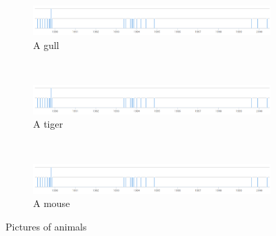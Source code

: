 \documentclass{article}
\begin{document}
\begin{figure}
    \centering
    \begin{subfigure}[b]{0.3\textwidth}
        \includegraphics[width=\textwidth]{../images/rg_timeline_pm230.png}
        \caption{A gull}
        \label{fig:gull}
    \end{subfigure}%
    ~ %
    \begin{subfigure}[b]{0.3\textwidth}
        \includegraphics[width=\textwidth]{../images/rg_timeline_pm230.png}
        \caption{A tiger}
        \label{fig:tiger}
    \end{subfigure}
    ~ %
    \begin{subfigure}[b]{0.3\textwidth}
        \includegraphics[width=\textwidth]{../images/rg_timeline_pm230.png}
        \caption{A mouse}
        \label{fig:mouse}
    \end{subfigure}
    \caption{Pictures of animals}\label{fig:animals}
\end{figure}
\end{document}
